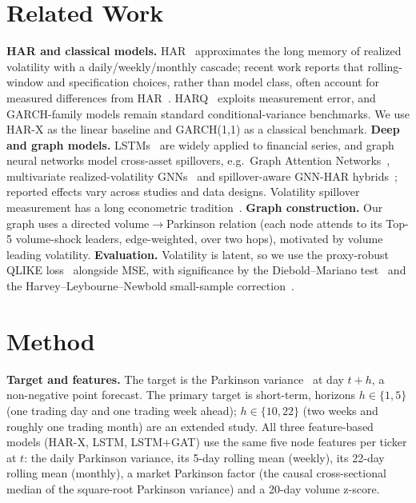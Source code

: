 \documentclass[runningheads]{llncs}
\begin{document}
\section{Related Work}
\textbf{HAR and classical models.} HAR~\cite{corsi2009} approximates the long memory of realized volatility
with a daily/weekly/monthly cascade; recent work reports that rolling-window and specification choices, rather
than model class, often account for measured differences from HAR~\cite{audrino2025}. HARQ~\cite{harq2016}
exploits measurement error, and GARCH-family models remain standard conditional-variance benchmarks. We use
HAR-X as the linear baseline and GARCH(1,1) as a classical benchmark. \textbf{Deep and graph models.} LSTMs~\cite{lstm1997} are widely applied to
financial series, and graph neural networks model cross-asset spillovers, e.g.\ Graph Attention
Networks~\cite{gat2018}, multivariate realized-volatility GNNs~\cite{chen2022} and spillover-aware GNN-HAR
hybrids~\cite{gnnhar2025}; reported effects vary across studies and data designs. Volatility spillover
measurement has a long econometric tradition~\cite{dy2012}. \textbf{Graph construction.} Our graph uses a
directed volume$\to$Parkinson relation (each node attends to its Top-5 volume-shock leaders, edge-weighted,
over two hops), motivated by volume leading volatility. \textbf{Evaluation.} Volatility is latent, so we use
the proxy-robust QLIKE loss~\cite{patton2011} alongside MSE, with significance by the Diebold--Mariano
test~\cite{dm1995} and the Harvey--Leybourne--Newbold small-sample correction~\cite{hln1997}.

\section{Method}
\textbf{Target and features.} The target is the Parkinson variance~\cite{parkinson1980} at day $t{+}h$, a
non-negative point forecast. The primary target is short-term, horizons $h\in\{1,5\}$ (one trading day and one
trading week ahead); $h\in\{10,22\}$ (two weeks and roughly one trading month) are an extended study. All
three feature-based models (HAR-X, LSTM, LSTM+GAT) use the same five node features per ticker at $t$: the daily Parkinson variance, its 5-day
rolling mean (weekly), its 22-day rolling mean (monthly), a market Parkinson factor (the causal cross-sectional
median of the square-root Parkinson variance) and a 20-day volume z-score.
\end{document}
